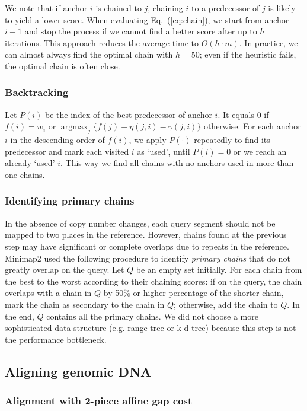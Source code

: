 \documentclass{bioinfo}
\DeclareMathOperator*{\argmax}{argmax}
\begin{document}
\begin{methods}
We note that if anchor $i$ is chained to $j$, chaining $i$ to a predecessor
of $j$ is likely to yield a lower score. When evaluating Eq.~(\ref{eq:chain}),
we start from anchor $i-1$ and stop the process if we cannot find a better
score after up to $h$ iterations. This approach reduces the average time to
$O(h\cdot m)$. In practice, we can almost always find the optimal chain with
$h=50$; even if the heuristic fails, the optimal chain is often close.

\subsubsection{Backtracking}
Let $P(i)$ be the index of the best predecessor of anchor $i$. It equals 0 if
$f(i)=w_i$ or $\argmax_j\{f(j)+\eta(j,i)-\gamma(j,i)\}$ otherwise. For each
anchor $i$ in the descending order of $f(i)$, we apply $P(\cdot)$ repeatedly to
find its predecessor and mark each visited $i$ as `used', until $P(i)=0$ or we
reach an already `used' $i$. This way we find all chains with no anchors used
in more than one chains.

\subsubsection{Identifying primary chains}\label{sec:primary}
In the absence of copy number changes, each query segment should not be mapped
to two places in the reference. However, chains found at the previous step may
have significant or complete overlaps due to repeats in the reference.
Minimap2 used the following procedure to identify \emph{primary chains} that do
not greatly overlap on the query. Let $Q$ be an empty set initially. For each
chain from the best to the worst according to their chaining scores: if on the
query, the chain overlaps with a chain in $Q$ by 50\% or higher percentage of
the shorter chain, mark the chain as secondary to the chain in $Q$; otherwise,
add the chain to $Q$. In the end, $Q$ contains all the primary chains. We did
not choose a more sophisticated data structure (e.g. range tree or k-d tree)
because this step is not the performance bottleneck.

\subsection{Aligning genomic DNA}\label{sec:genomic}

\subsubsection{Alignment with 2-piece affine gap cost}


\end{methods}
\end{document}

